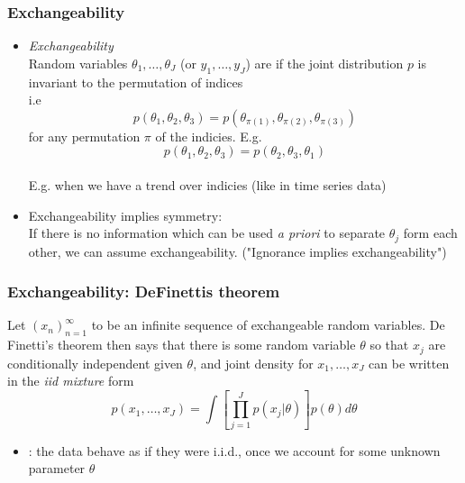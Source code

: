\documentclass[10pt]{beamer}
\begin{document}
\begin{frame}

\frametitle{Exchangeability}

  \begin{itemize}
  \item \textit{Exchangeability} \\ Random variables
    $\theta_1,\ldots,\theta_J$ (or $y_1,\ldots,y_J$) are
     if the joint distribution $p$ is invariant to the
    permutation of indices\\
    i.e
    \begin{equation*}
      p(\theta_1,\theta_2,\theta_3) = p(\theta_{\pi(1)},\theta_{\pi(2)},\theta_{\pi(3)})
    \end{equation*}
    for any permutation $\pi$ of the indicies. E.g.
    \begin{equation*}
      p(\theta_1,\theta_2,\theta_3) = p(\theta_2,\theta_3,\theta_1)
    \end{equation*}
\pause
   \\ \pause
  E.g. when we have a trend over indicies (like in time series data)
\pause
  \item Exchangeability implies symmetry: \\If there is no information
    which can be used \textit{a priori} to separate $\theta_j$ form
    each other, we can assume exchangeability. ("Ignorance implies exchangeability")

  \end{itemize}
\end{frame}


\begin{frame}

\frametitle{Exchangeability: DeFinettis theorem}

  Let $(x_n)_{n=1}^{\infty}$ to be an infinite sequence of
    exchangeable random variables. De Finetti's theorem then says that
    there is some random variable $\theta$ so that $x_j$ are
    conditionally independent given $\theta$, and joint density for
    $x_1,\ldots,x_J$ can be written in the \textit{iid mixture} form
    \begin{equation*}
      p(x_1,\ldots,x_J)=\int \left[\prod_{j=1}^J p(x_j|\theta)\right]p(\theta)d\theta
    \end{equation*}
\begin{itemize}
\item {}: the data behave as if they were i.i.d., once we account for some unknown parameter $\theta$
\end{itemize}
\end{frame}
\end{document}

